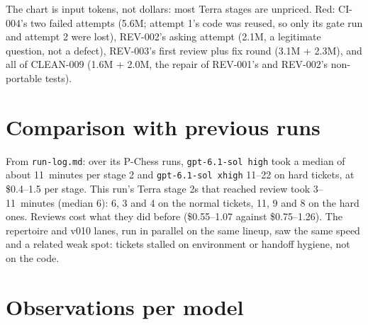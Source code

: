 \documentclass[11pt,a4paper]{article}
\begin{document}
\begin{center}
\end{center}

The chart is input tokens, not dollars: most Terra stages are unpriced. Red: CI-004's two failed
attempts (5.6M; attempt 1's code was reused, so only its gate run and attempt 2 were lost),
REV-002's asking attempt (2.1M, a legitimate question, not a defect), REV-003's first review
plus fix round (3.1M + 2.3M), and all of CLEAN-009 (1.6M + 2.0M, the repair of REV-001's and
REV-002's non-portable tests).

\section*{Comparison with previous runs}

From \texttt{run-log.md}: over its P-Chess runs, \texttt{gpt-6.1-sol high} took a median of about
11~minutes per stage 2 and \texttt{gpt-6.1-sol xhigh} 11--22 on hard tickets, at \$0.4--1.5 per
stage. This run's Terra stage 2s that reached review took 3--11~minutes (median 6): 6, 3 and 4 on
the normal tickets, 11, 9 and 8 on the hard ones. Reviews cost what they did before
(\$0.55--1.07 against \$0.75--1.26). The repertoire and v010 lanes, run in parallel on the same
lineup, saw the same speed and a related weak spot: tickets stalled on environment or handoff
hygiene, not on the code.

\section*{Observations per model}
\end{document}
